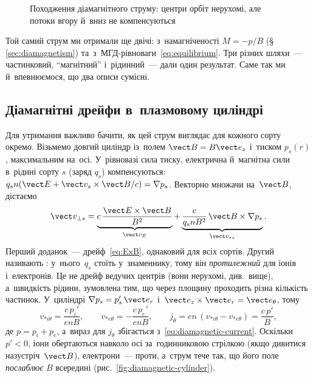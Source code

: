 \begin{figure}[ht]\centering
	\caption{Походження діамагнітного струму: центри орбіт нерухомі, але потоки вгору
	й~вниз не компенсуються}
	\label{fig:diamagnetic-flux}
\end{figure}

Той самий струм ми отримали ще двічі: з~намагніченості $M=-p/B$ (§\,\ref{sec:diamagnetism})
та~з~МГД-рівноваги~\eqref{eq:equilibrium}. Три різних шляхи~--- частинковий,
\enquote{магнітний} і~рідинний~--- дали один результат. Саме так ми й~впевнюємося, що два
описи сумісні.


\subsection*{Діамагнітні дрейфи в~плазмовому циліндрі}


Для утримання важливо бачити, як цей струм виглядає для кожного сорту окремо. Візьмемо
довгий циліндр із~полем $\vect B=B\vect e_z$ і~тиском $p_s(r)$, максимальним на~осі. У~рівновазі
сила тиску, електрична й~магнітна сили в~рідині сорту $s$ (заряд $q_s$) компенсуються:
$q_sn(\vect E+\vect v_s\times\vect B/c)=\nabla p_s$. Векторно множачи на~$\vect B$, дістаємо
\begin{equation}\label{eq:diamagnetic-drift}
	\vect v_{\perp s}=\underbrace{c\,\frac{\vect E\times\vect B}{B^2}}_{\vect v_E}
	+\underbrace{\frac{c}{q_sn B^2}\,\vect B\times\nabla p_s}_{\vect v_{*s}}.
\end{equation}
Перший доданок~--- дрейф~\eqref{eq:ExB}, однаковий для всіх сортів. Другий називають
: у~нього~$q_s$ стоїть
у~знаменнику, тому він \emph{протилежний} для іонів і~електронів. Це не дрейф
ведучих центрів (вони нерухомі, див.~вище), а~швидкість рідини, зумовлена тим, що
через площину проходить різна кількість частинок. У~циліндрі $\nabla p_s=p_s'\,\vect e_r$ і~$\vect e_z\times\vect e_r=\vect e_\theta$, тому
\[
v_{*i\theta}=\frac{c\,p_i'}{enB},\qquad v_{*e\theta}=-\frac{c\,p_e'}{enB},\qquad
j_\theta=en\,(v_{*i\theta}-v_{*e\theta})=\frac{c\,p'}{B},
\]
де $p=p_i+p_e$, а~вираз для $j_\theta$ збігається з~\eqref{eq:diamagnetic-current}.
Оскільки $p'<0$, іони обертаються навколо осі за~годинниковою стрілкою (якщо дивитися
назустріч~$\vect B$), електрони~--- проти, а~струм тече так, що його поле \emph{послаблює}
$B$ всередині (рис.~\ref{fig:diamagnetic-cylinder}).

